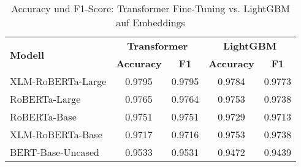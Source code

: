 \begin{table}[!ht]
\centering
\begin{tabular}{lcccc}
    \toprule
    \multirow{2}{*}{\textbf{Modell}} &
    \multicolumn{2}{c}{\textbf{Transformer}} &
    \multicolumn{2}{c}{\textbf{LightGBM}} \\
    \cmidrule(lr){2-3} \cmidrule(lr){4-5}
    & \textbf{Accuracy} & \textbf{F1} & \textbf{Accuracy} & \textbf{F1} \\
    \midrule
    XLM-RoBERTa-Large & 0.9795 & 0.9795 & 0.9784 & 0.9773 \\
    RoBERTa-Large     & 0.9765 & 0.9764 & 0.9753 & 0.9738 \\
    RoBERTa-Base      & 0.9751 & 0.9751 & 0.9729 & 0.9713 \\
    XLM-RoBERTa-Base  & 0.9717 & 0.9716 & 0.9753 & 0.9738 \\
    BERT-Base-Uncased & 0.9533 & 0.9531 & 0.9472 & 0.9439 \\
    \bottomrule
\end{tabular}
\caption{Accuracy und F1-Score: Transformer Fine-Tuning vs. LightGBM auf Embeddings}
\end{table}
